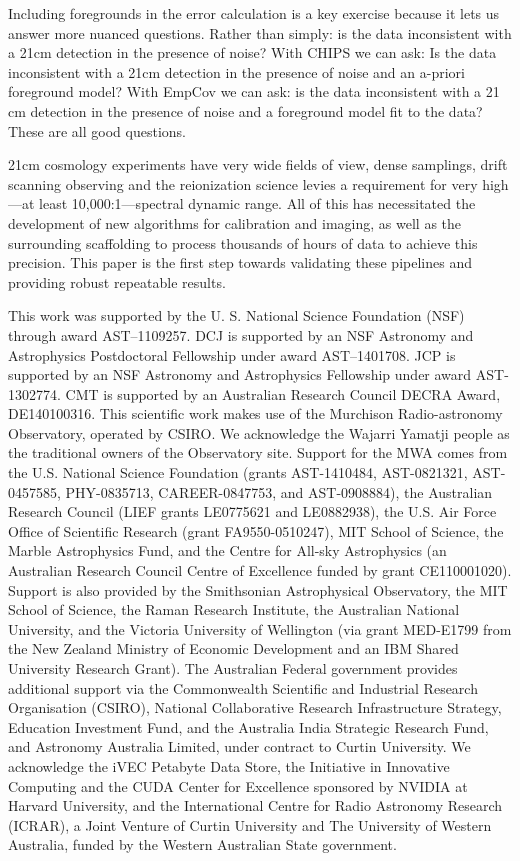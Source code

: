 \documentclass[twolcolumn,iop]{emulateapj}
\def\empirical{EmpCov}
\begin{document}
Including foregrounds in the error calculation is a key exercise because it lets us answer more nuanced questions. Rather than simply: is the data inconsistent with a 21cm detection in the presence of noise? With CHIPS we can ask: Is the data inconsistent with a 21cm detection in the presence of noise and an a-priori foreground model? With \empirical{} we can ask: is the data inconsistent with a 21 cm detection in the presence of noise and a foreground model fit to the data? These are all good questions.

21cm cosmology experiments have very wide fields of view, dense samplings, drift scanning observing and the reionization science levies a requirement for very high---at least 10,000:1---spectral dynamic range. All of this has necessitated the development of new algorithms for calibration and imaging, as well as the surrounding scaffolding to process thousands of hours of data to achieve this precision.  This paper is the first step towards validating these pipelines and providing robust repeatable results.





\acknowledgments

This work was supported	 by the U. S. National Science Foundation (NSF) through award AST--1109257. DCJ is supported by an NSF Astronomy and Astrophysics Postdoctoral Fellowship under award AST--1401708. JCP is supported by an NSF Astronomy and Astrophysics Fellowship under award AST-1302774. CMT is supported by an Australian Research Council DECRA Award, DE140100316. This scientific work makes use of the Murchison Radio-astronomy Observatory, operated by CSIRO. We acknowledge the Wajarri Yamatji people as the traditional owners of the Observatory site. Support for the MWA comes from the U.S. National Science Foundation (grants  AST-1410484, AST-0821321, AST-0457585, PHY-0835713, CAREER-0847753, and AST-0908884), the Australian Research Council (LIEF grants LE0775621 and LE0882938), the U.S. Air Force Office of Scientific Research (grant FA9550-0510247), MIT School of Science, the Marble Astrophysics Fund, and the Centre for All-sky Astrophysics (an Australian Research Council Centre of Excellence funded by grant CE110001020). Support is also provided by the Smithsonian Astrophysical Observatory, the MIT School of Science, the Raman Research Institute, the Australian National University, and the Victoria University of Wellington (via grant MED-E1799 from the New Zealand Ministry of Economic Development and an IBM Shared University Research Grant). The Australian Federal government provides additional support via the Commonwealth Scientific and Industrial Research Organisation (CSIRO), National Collaborative Research Infrastructure Strategy, Education Investment Fund, and the Australia India Strategic Research Fund, and Astronomy Australia Limited, under contract to Curtin University. We acknowledge the iVEC Petabyte Data Store, the Initiative in Innovative Computing and the CUDA Center for Excellence sponsored by NVIDIA at Harvard University, and the International Centre for Radio Astronomy Research (ICRAR), a Joint Venture of Curtin University and The University of Western Australia, funded by the Western Australian State government.


\end{document}
